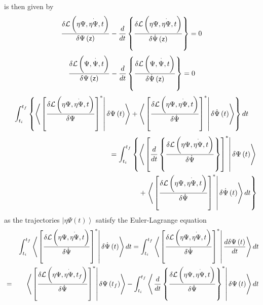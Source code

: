 \documentclass[aps,preprint]{revtex4}
\begin{document}
is then given by%
\begin{equation}
\frac{\delta \mathcal{L}\left( \eta \Psi ,\overset{\cdot }{\eta \Psi }%
,t\right) }{\delta \Psi \left( \mathsf{z}\right) }-\frac{d}{dt}\left\{ \frac{%
\delta \mathcal{L}\left( \eta \Psi ,\overset{\cdot }{\eta \Psi },t\right) }{%
\delta \dot{\Psi}\left( \mathsf{z}\right) }\right\} =0
\end{equation}%
\begin{equation}
\frac{\delta \mathcal{L}\left( \Psi ,\overset{\cdot }{\Psi },t\right) }{%
\delta \Psi \left( \mathsf{z}\right) }-\frac{d}{dt}\left\{ \frac{\delta 
\mathcal{L}\left( \Psi ,\overset{\cdot }{\Psi },t\right) }{\delta \dot{\Psi}%
\left( \mathsf{z}\right) }\right\} =0
\end{equation}%
\begin{equation}
\int_{t_{i}}^{t_{f}}\left\{ \left\langle \left. \left[ \frac{\delta \mathcal{%
L}\left( \eta \Psi ,\overset{\cdot }{\eta \Psi },t\right) }{\delta \Psi }%
\right] ^{\ast }\right\vert \delta \Psi \left( t\right) \right\rangle
+\left\langle \left. \left[ \frac{\delta \mathcal{L}\left( \eta \Psi ,%
\overset{\cdot }{\eta \Psi },t\right) }{\delta \dot{\Psi}}\right] ^{\ast
}\right\vert \delta \dot{\Psi}\left( t\right) \right\rangle \right\} dt
\end{equation}%
\begin{eqnarray}
&&\left. =\right. \int_{t_{i}}^{t_{f}}\left\{ \left\langle \left. \left[ 
\frac{d}{dt}\left\{ \frac{\delta \mathcal{L}\left( \eta \Psi ,\overset{\cdot 
}{\eta \Psi },t\right) }{\delta \dot{\Psi}}\right\} \right] ^{\ast
}\right\vert \delta \Psi \left( t\right) \right\rangle \right.  \notag \\
&&\qquad \qquad \qquad \qquad \qquad \qquad \qquad \qquad \qquad +\left.
\left\langle \left. \left[ \frac{\delta \mathcal{L}\left( \eta \Psi ,\overset%
{\cdot }{\eta \Psi },t\right) }{\delta \dot{\Psi}}\right] ^{\ast
}\right\vert \delta \dot{\Psi}\left( t\right) \right\rangle dt\right\}
\end{eqnarray}%
as the trajectories $\left\vert \eta \Psi \left( t\right) \right\rangle $
satisfy the Euler-Lagrange equation%
\begin{eqnarray}
&&\int_{t_{i}}^{t_{f}}\left\langle \left. \left[ \frac{\delta \mathcal{L}%
\left( \eta \Psi ,\overset{\cdot }{\eta \Psi },t\right) }{\delta \dot{\Psi}}%
\right] ^{\ast }\right\vert \delta \dot{\Psi}\left( t\right) \right\rangle
dt=\int_{t_{i}}^{t_{f}}\left\langle \left. \left[ \frac{\delta \mathcal{L}%
\left( \eta \Psi ,\overset{\cdot }{\eta \Psi },t\right) }{\delta \dot{\Psi}}%
\right] ^{\ast }\right\vert \frac{d\delta \Psi \left( t\right) }{dt}%
\right\rangle dt  \notag \\
&=&\left\langle \left. \left[ \frac{\delta \mathcal{L}\left( \eta \Psi ,%
\overset{\cdot }{\eta \Psi },t_{f}\right) }{\delta \dot{\Psi}}\right] ^{\ast
}\right\vert \delta \Psi \left( t_{f}\right) \right\rangle
-\int_{t_{i}}^{t_{f}}\left\langle \left. \frac{d}{dt}\left\{ \frac{\delta 
\mathcal{L}\left( \eta \Psi ,\overset{\cdot }{\eta \Psi },t\right) }{\delta 
\dot{\Psi}}\right\} ^{\ast }\right\vert \delta \Psi \left( t\right)
\right\rangle dt
\end{eqnarray}%
\end{document}
